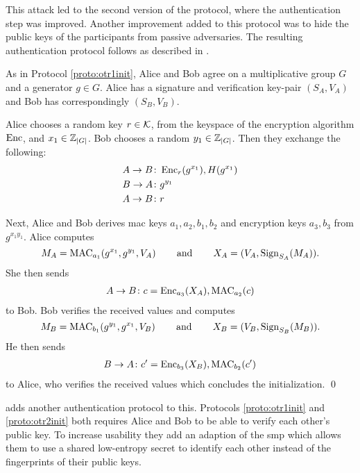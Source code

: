 This attack led to the second version of the protocol, where the authentication 
step was improved.
Another improvement added to this protocol was to hide the public keys of the 
participants from passive adversaries.
The resulting authentication protocol follows as described in \cite{otr2007}.

\begin{protocol}
  \label{proto:otr2init}
  As in Protocol \ref{proto:otr1init}, Alice and Bob agree on a multiplicative 
  group \(G\) and a generator \(g\in G\).
  Alice has a signature and verification key-pair \((S_A, V_A)\) and Bob has 
  correspondingly \((S_B, V_B)\).

  Alice chooses a random key \(r\in \operatorname{\mathcal K}\), from the keyspace of the encryption 
  algorithm \(\operatorname{\mathrm{Enc}}\), and \(x_1\in \operatorname{\mathbb Z}_{|G|}\).
  Bob chooses a random \(y_1\in \operatorname{\mathbb Z}_{|G|}\).
  Then they exchange the following:
  \begin{align*}
    A\to B &\colon \operatorname{\mathrm{Enc}}_r( g^{x_1} ), H( g^{x_1} ) \\
    B\to A &\colon g^{y_1} \\
    A\to B &\colon r
  \end{align*}

  Next, Alice and Bob derives \ac{mac} keys \(a_1, a_2, b_1, b_2\) and 
  encryption keys \(a_3, b_3\) from \(g^{x_1 y_1}\).
  Alice computes \[M_A = \operatorname{\mathrm{MAC}}_{a_1}( g^{x_1}, g^{y_1}, V_A )\operatorname{\qquad and\qquad} X_A 
  = ( V_A, \operatorname{\mathrm{Sign}}_{S_A}( M_A ) ).\]
  She then sends
  \begin{align*}
    A\to B\colon c = \operatorname{\mathrm{Enc}}_{a_3}( X_A ), \operatorname{\mathrm{MAC}}_{a_2}( c )
  \end{align*}
  to Bob.
  Bob verifies the received values and computes \[M_B = \operatorname{\mathrm{MAC}}_{b_1}( g^{y_1}, 
  g^{x_1}, V_B )\operatorname{\qquad and\qquad} X_B = ( V_B, \operatorname{\mathrm{Sign}}_{S_B}( M_B ) ).\]
  He then sends
  \begin{align*}
    B\to A\colon c^\prime = \operatorname{\mathrm{Enc}}_{b_3}( X_B ), \operatorname{\mathrm{MAC}}_{b_2}( c^\prime )
  \end{align*}
  to Alice, who verifies the received values which concludes the 
  initialization.
  \qed
\end{protocol}

\citeauthor{otr2007} \cite{otr2007} adds another authentication protocol to 
this.
Protocols \ref{proto:otr1init} and \ref{proto:otr2init} both requires Alice and 
Bob to be able to verify each other's public key.
To increase usability they add an adaption of the \ac{smp} \cite{smp} which 
allows them to use a shared low-entropy secret to identify each other instead 
of the fingerprints of their public keys.

